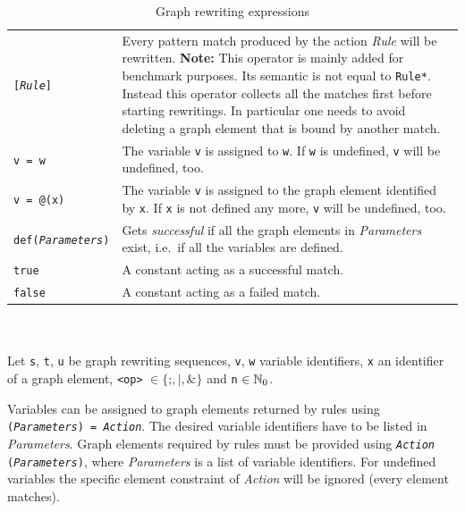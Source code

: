 \begin{table}[htbp]
\begin{minipage}{\linewidth}
\begin{tabularx}{\linewidth}{|lX|}
\texttt{[\emph{Rule}]} & Every pattern match produced by the action \emph{Rule} will be rewritten. \textbf{Note:} This operator is mainly added for benchmark purposes. Its semantic is not equal to \texttt{Rule*}. Instead this operator collects all the matches first before starting rewritings. In particular one needs to avoid deleting a graph element that is bound by another match. \\
\texttt{v = w}	& The variable \texttt{v} is assigned to \texttt{w}. If \texttt{w} is undefined, \texttt{v} will be undefined, too.\\
\texttt{v = @(x)}	& The variable \texttt{v} is assigned to the graph element identified by \texttt{x}. If \texttt{x} is not defined any more, \texttt{v} will be undefined, too.\\
\texttt{def(\emph{Parameters})} & Gets \emph{successful} if all the graph elements in \emph{Parameters} exist, i.e.\ if all the variables are defined.\\
\texttt{true}	& A constant acting as a successful match.\\
\texttt{false}	& A constant acting as a failed match.\\ \hline
\end{tabularx}
\end{minipage}\\
\\ \centering
{\small Let \texttt{s}, \texttt{t}, \texttt{u} be graph rewriting sequences, \texttt{v}, \texttt{w} variable identifiers, \texttt{x} an identifier of a graph element, \texttt{<op>} $\in \{\texttt{;}, \texttt{|}, \texttt{\&}\}$ and \texttt{n} $\in \mathbb{N}_0$.}
\caption{Graph rewriting expressions}
\label{ruletab}
\end{table}
\makeatother

Variables can be assigned to graph elements returned by rules using \texttt{(\emph{Para\-meters}) = \emph{Action}}. The desired variable identifiers have to be listed in \emph{Parameters}. Graph elements required by rules must be provided using \texttt{\emph{Action} (\emph{Para\-meters})}, where \emph{Parameters} is a list of variable identifiers. For undefined variables the specific element constraint of \emph{Action} will be ignored (every element matches).\\


